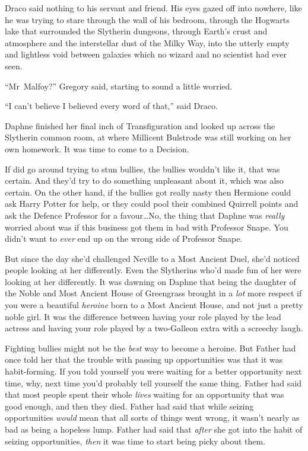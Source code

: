 Draco said nothing to his servant and friend. His eyes gazed off into nowhere, like he was trying to stare through the wall of his bedroom, through the Hogwarts lake that surrounded the Slytherin dungeons, through Earth’s crust and atmosphere and the interstellar dust of the Milky Way, into the utterly empty and lightless void between galaxies which no wizard and no scientist had ever seen.

“Mr~Malfoy?” Gregory said, starting to sound a little worried.

“I can’t believe I believed every word of that,” said Draco.

\later

Daphne finished her final inch of Transfiguration and looked up across the Slytherin common room, at where Millicent Bulstrode was still working on her own homework. It was time to come to a Decision.

If \SPHEW{} did go around trying to stun bullies, the bullies wouldn’t like it, that was certain. And they’d try to do something unpleasant about it, which was also certain. On the other hand, if the bullies got really nasty then Hermione could ask Harry Potter for help, or they could pool their combined Quirrell points and ask the Defence Professor for a favour…No, the thing that Daphne was \emph{really} worried about was if this business got them in bad with Professor Snape. You didn’t want to \emph{ever} end up on the wrong side of Professor Snape.

But since the day she’d challenged Neville to a Most Ancient Duel, she’d noticed people looking at her differently. Even the Slytherins who’d made fun of her were looking at her differently. It was dawning on Daphne that being the daughter of the Noble and Most Ancient House of Greengrass brought in a \emph{lot} more respect if you were a beautiful \emph{heroine} born to a Most Ancient House, and not just a pretty noble girl. It was the difference between having your role played by the lead actress and having your role played by a two-Galleon extra with a screechy laugh.

Fighting bullies might not be the \emph{best} way to become a heroine. But Father had once told her that the trouble with passing up opportunities was that it was habit-forming. If you told yourself you were waiting for a better opportunity next time, why, next time you’d probably tell yourself the same thing. Father had said that most people spent their whole \emph{lives} waiting for an opportunity that was good enough, and then they died. Father had said that while seizing opportunities \emph{would} mean that all sorts of things went wrong, it wasn’t nearly as bad as being a hopeless lump. Father had said that \emph{after} she got into the habit of seizing opportunities, \emph{then} it was time to start being picky about them.

